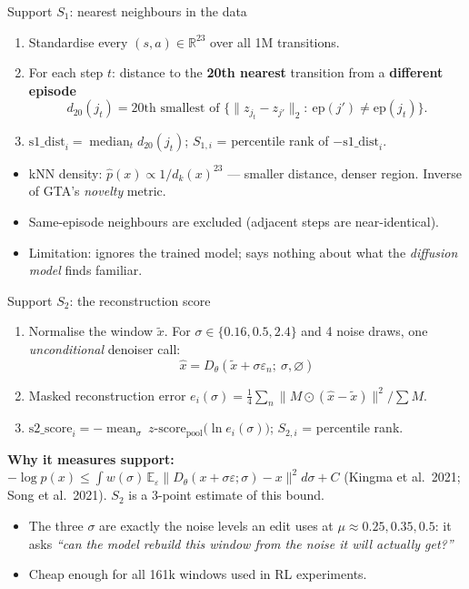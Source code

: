 \documentclass[aspectratio=169,11pt]{beamer}
\begin{document}
\begin{frame}{Support $S_1$: nearest neighbours in the data}
\begin{enumerate}
\item Standardise every $(s,a)\in\mathbb R^{23}$ over all 1M transitions.
\item For each step $t$: distance to the \textbf{20th nearest} transition from a \textbf{different episode}
\[
d_{20}(j_t)=\text{20th smallest of }\{\lVert z_{j_t}-z_{j'}\rVert_2:\ \text{ep}(j')\neq\text{ep}(j_t)\}.
\]
\item $\text{s1\_dist}_i=\operatorname{median}_t d_{20}(j_t)$; $S_{1,i}$ = percentile rank of $-\text{s1\_dist}_i$.
\end{enumerate}
\vspace{0.4em}
\begin{itemize}
\item kNN density: $\hat p(x)\propto 1/d_k(x)^{23}$ --- smaller distance, denser region. Inverse of GTA's \emph{novelty} metric.
\item Same-episode neighbours are excluded (adjacent steps are near-identical).
\item Limitation: ignores the trained model; says nothing about what the \emph{diffusion model} finds familiar.
\end{itemize}
\end{frame}

\begin{frame}{Support $S_2$: the reconstruction score}
\begin{enumerate}
\item Normalise the window $\tilde x$. For $\sigma\in\{0.16,0.5,2.4\}$ and 4 noise draws, one \emph{unconditional} denoiser call:
\[
\hat x=D_\theta(\tilde x+\sigma\varepsilon_n;\ \sigma,\varnothing)
\]
\item Masked reconstruction error $e_i(\sigma)=\tfrac14\sum_n \lVert M\odot(\hat x-\tilde x)\rVert^2/\textstyle\sum M$.
\item $\text{s2\_score}_i=-\operatorname{mean}_\sigma\ z\text{-score}_{\text{pool}}\big(\ln e_i(\sigma)\big)$; \quad $S_{2,i}$ = percentile rank.
\end{enumerate}
\vspace{0.4em}
\textbf{Why it measures support:}
$-\log p(x)\le\int w(\sigma)\,\mathbb E_\varepsilon\lVert D_\theta(x+\sigma\varepsilon;\sigma)-x\rVert^2d\sigma+C$
(Kingma et al.\ 2021; Song et al.\ 2021). $S_2$ is a 3-point estimate of this bound.
\vspace{0.3em}

\begin{itemize}
\item The three $\sigma$ are exactly the noise levels an edit uses at $\mu\approx0.25,0.35,0.5$: it asks \emph{``can the model rebuild this window from the noise it will actually get?''}
\item Cheap enough for all 161k windows used in RL experiments.
\end{itemize}
\end{frame}
\end{document}

